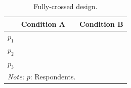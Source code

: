 \documentclass[12pt]{book}
\begin{document}
\begin{table}[h!]
		\caption{Fully-crossed design.}
		\label{tab:fully} \centering \onehalfspacing
		\begin{tabular}{p{1cm}| p{1.5cm} p{1.5cm} p{1.5cm} p{0.05cm} p{1.5cm} p{1.5cm} p{1.5cm}}
			\toprule
		& \multicolumn{3}{c}{Condition A} & & \multicolumn{3}{c}{Condition B}\\
		\midrule
		\multirow{2}{*}{$p_1$} & \Cat[2] & \Snowman[2.5] & \NiceReapey[2] & & \Cat[2] & \Snowman[2.5] & \NiceReapey[2] \\
			 & \Cat[2] & \Snowman[2.5] & \NiceReapey[2] & & \Cat[2] & \Snowman[2.5] & \NiceReapey[2] \\
			 \hline
		\multirow{2}{*}{$p_2$} & \Cat[2] & \Snowman[2.5] & \NiceReapey[2] & & \Cat[2] & \Snowman[2.5] & \NiceReapey[2] \\
		 & \Cat[2] & \Snowman[2.5] & \NiceReapey[2] & & \Cat[2] & \Snowman[2.5] & \NiceReapey[2] \\
		 \hline
		\multirow{2}{*}{$p_3$} & \Cat[2] & \Snowman[2.5] & \NiceReapey[2] & & \Cat[2] & \Snowman[2.5] & \NiceReapey[2] \\
		& \Cat[2] & \Snowman[2.5] & \NiceReapey[2] & & \Cat[2] & \Snowman[2.5] & \NiceReapey[2] \\
		\bottomrule
		\multicolumn{8}{p{10cm}}{\emph{Note:} $p$: Respondents.}
	\end{tabular}
\end{table}


\end{document}
